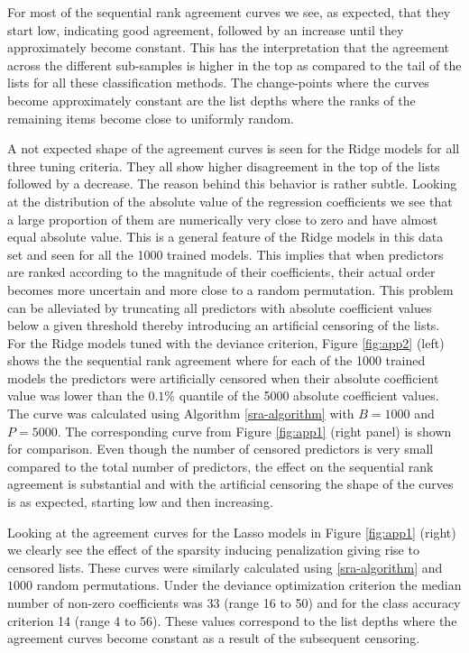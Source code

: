 \documentclass[12pt,a4paper]{article}
\theoremstyle{plain}
\begin{document}
For most of the sequential rank agreement curves we see, as expected,
that they start low, indicating good agreement, followed by an
increase until they approximately become constant. This has the
interpretation that the agreement across the different sub-samples is
higher in the top as compared to the tail of the lists for all these
classification methods. The change-points where the curves become
approximately constant are the list depths where the ranks of the
remaining items become close to uniformly random.

A not expected shape of the agreement curves is seen for the Ridge
models for all three tuning criteria. They all show higher
disagreement in the top of the lists followed by a decrease. The
reason behind this behavior is rather subtle. Looking at the
distribution of the absolute value of the regression coefficients we see that a large
proportion of them are numerically very close to zero and have almost
equal absolute value. This is a general feature of the Ridge models in
this data set and seen for all the 1000 trained models.
This implies that when predictors are ranked according to the
magnitude of their coefficients, their actual order becomes more
uncertain and more close to a random permutation. This problem can be
alleviated by truncating all predictors with absolute coefficient values
below a given threshold thereby introducing an artificial censoring of the lists.
For the Ridge models tuned with the deviance criterion, Figure \ref{fig:app2} (left) shows the
the sequential rank agreement where for each of the 1000 trained
models the predictors were artificially censored when their absolute
coefficient value was lower than the $0.1\%$ quantile of the 5000
absolute coefficient values. The curve was calculated
using Algorithm \ref{sra-algorithm} with $B=1000$ and $P=5000$. The corresponding
curve from Figure \ref{fig:app1} (right panel) is shown for comparison.
Even though the number of censored predictors is very small compared to the total
number of predictors, the effect on the sequential rank agreement is
substantial and with the artificial censoring the shape of the curves
is as expected, starting low and then increasing.

Looking at the agreement curves for the Lasso models in Figure \ref{fig:app1}
(right) we clearly see the effect of the sparsity inducing penalization giving
rise to censored lists. These curves were similarly calculated using \ref{sra-algorithm}
and $1000$ random permutations. Under the deviance optimization criterion the
median number of non-zero coefficients was 33 (range 16 to 50) and for the
class accuracy criterion 14 (range 4 to 56). These values correspond to
the list depths where the agreement curves become constant as a result of
the subsequent censoring.
\end{document}
